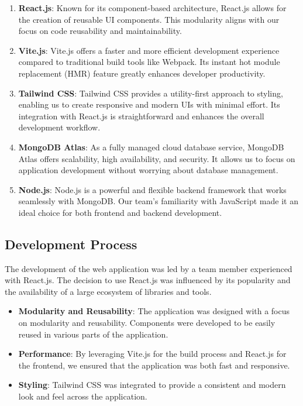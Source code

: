 \documentclass{article}
\begin{document}
\begin{enumerate}
    \item \textbf{React.js}: Known for its component-based architecture, React.js allows for the creation of reusable UI components. This modularity aligns with our focus on code reusability and maintainability.
    \item \textbf{Vite.js}: Vite.js offers a faster and more efficient development experience compared to traditional build tools like Webpack. Its instant hot module replacement (HMR) feature greatly enhances developer productivity.
    \item \textbf{Tailwind CSS}: Tailwind CSS provides a utility-first approach to styling, enabling us to create responsive and modern UIs with minimal effort. Its integration with React.js is straightforward and enhances the overall development workflow.
    \item \textbf{MongoDB Atlas}: As a fully managed cloud database service, MongoDB Atlas offers scalability, high availability, and security. It allows us to focus on application development without worrying about database management.
    \item \textbf{Node.js}: Node.js is a powerful and flexible backend framework that works seamlessly with MongoDB. Our team's familiarity with JavaScript made it an ideal choice for both frontend and backend development.
\end{enumerate}

\subsection{Development Process}

The development of the web application was led by a team member experienced with React.js. The decision to use React.js was influenced by its popularity and the availability of a large ecosystem of libraries and tools.

\begin{itemize}
    \item \textbf{Modularity and Reusability}: The application was designed with a focus on modularity and reusability. Components were developed to be easily reused in various parts of the application.
    \item \textbf{Performance}: By leveraging Vite.js for the build process and React.js for the frontend, we ensured that the application was both fast and responsive.
    \item \textbf{Styling}: Tailwind CSS was integrated to provide a consistent and modern look and feel across the application.
\end{itemize}
\end{document}
